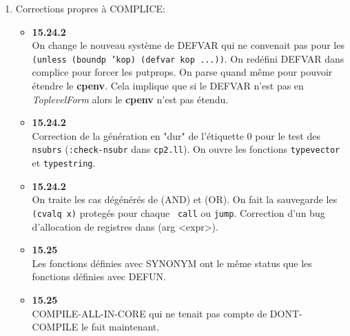 \begin {enumerate}
\begin {itemize}
\item {\bf 15.25} \\
Correction d'une anomalie de comportement du GC sur les symboles
plac\'{e}s en t\^{e}te de {\it bucket} dans la {\it table de hashage} de la
{\it oblist}. 

\item {\bf 15.25} \\
Le code LLM3 a \'{e}t\'{e} localement optimis\'{e} en plusieurs endroits.

\end {itemize}

\item Corrections propres \`{a} COMPLICE:

\begin {itemize}

\item {\bf 15.24.2} \\
On change le nouveau syst\`{e}me de DEFVAR qui ne convenait pas
pour les {\tt (unless (boundp 'kop) (defvar kop ...))}. On red\'{e}fini
DEFVAR dans complice pour forcer les putprops. On parse quand m\^{e}me
pour pouvoir \'{e}tendre le {\bf cpenv}. Cela implique que si le
DEFVAR n'est pas en {\it ToplevelForm} alors le {\bf cpenv}
n'est pas \'{e}tendu. 

\item {\bf 15.24.2} \\
Correction de la g\'{e}n\'{e}ration en "dur" de l'\'{e}tiquette 0 pour le
test des {\tt nsubrs} ({\tt :check-nsubr} dans {\tt cp2.ll}).
On ouvre les fonctions {\tt typevector} et {\tt typestring}.

\item {\bf 15.24.2} \\
On traite les cas d\'{e}g\'{e}n\'{e}r\'{e}s de (AND) et (OR).
On fait la sauvegarde les {\tt (cvalq x)} proteg\'{e}s pour chaque {\tt
call} ou {\tt jump}.
Correction d'un bug d'allocation de registres dans (arg <expr>).

\item {\bf 15.25} \\
Les fonctions d\'{e}finies avec SYNONYM ont le m\^{e}me status que les
fonctions d\'{e}finies avec DEFUN. 

\item {\bf 15.25} \\
COMPILE-ALL-IN-CORE qui ne tenait pas compte de DONT-COMPILE
le fait maintenant.

\end{itemize}


\end{enumerate}
